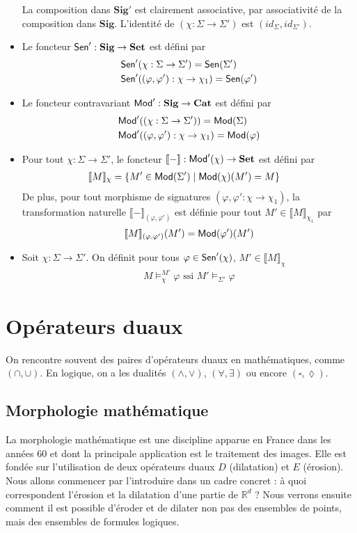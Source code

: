 \documentclass[11pt,a4paper]{article}
\newcommand{\ph}{\varphi}
\newcommand{\itemz}{\item[$\triangleright$]}
\newcommand{\gr}{\textbf}
\newcommand{\lb}{\llbracket}
\newcommand{\rb}{\rrbracket}
\newcommand{\info}[1]{\text{{\fontfamily{lmss}\selectfont #1}}}
\newcommand{\Mod}{\info{Mod}}
\newcommand{\Sen}{\info{Sen}}
\newcommand{\1}{\mathbbm{1}}
\begin{document}
\begin{itemize}
La composition dans $\gr{Sig}'$ est clairement associative, par associativité de la composition dans $\gr{Sig}$. L'identité de $(\chi : \Sigma \to \Sigma')$ est $(id_\Sigma,id_{\Sigma'})$.
\itemz Le foncteur $\Sen' : \gr{Sig} \to \gr{Set}$ est défini par
\begin{align*}
&\Sen'(\chi : \Sigma \to \Sigma') = \Sen(\Sigma') \\
&\Sen'((\ph,\ph') : \chi \to \chi_1) = \Sen(\ph') 
\end{align*}
\itemz Le foncteur contravariant $\Mod' : \gr{Sig} \to \gr{Cat}$ est défini par 
\begin{align*} 
& \Mod'((\chi : \Sigma \to \Sigma')) = \Mod(\Sigma) \\
& \Mod'((\ph,\ph') : \chi \to \chi_1) = \Mod(\ph)
\end{align*}
\itemz Pour tout $\chi : \Sigma \to \Sigma'$, le foncteur $\lb - \rb : \Mod'(\chi) \to \gr{Set}$ est défini par
\begin{align*}
& \lb M \rb_\chi = \{ M' \in \Mod(\Sigma') \mid \Mod(\chi)(M') = M \}
\end{align*}
De plus, pour tout morphisme de signatures $(\ph,\ph' : \chi \to \chi_1)$, la transformation naturelle $\lb - \rb_{(\ph,\ph')}$ est définie pour tout $M' \in \lb M \rb_{\chi_1}$ par
\[ \lb M \rb_{(\ph,\ph')}(M') = \Mod(\ph')(M') \]
\itemz Soit $\chi : \Sigma \to \Sigma'$. On définit pour tous $\ph \in \Sen'(\chi)$, $M' \in \lb M \rb_\chi$
\begin{align*}
M \models_\chi^{M'} \ph \text{ ssi } M' \models_{\Sigma'} \ph
\end{align*}
\end{itemize}
\newpage
\section{Opérateurs duaux}
On rencontre souvent des paires d'opérateurs duaux en mathématiques, comme $(\cap,\cup)$. En logique, on a les dualités $(\wedge,\vee)$, $(\forall,\exists)$ ou encore $(\square,\lozenge)$.
\subsection{Morphologie mathématique}
La morphologie mathématique est une discipline apparue en France dans les années 60 et dont la principale application est le traitement des images. Elle est fondée sur l'utilisation de deux opérateurs duaux $D$ (dilatation) et $E$ (érosion). Nous allons commencer par l'introduire dans un cadre concret : à quoi correspondent l'érosion et la dilatation d'une partie de $\mathbb{R}^d$ ? Nous verrons ensuite comment il est possible d'éroder et de dilater non pas des ensembles de points, mais des ensembles de formules logiques.
\newpage
\end{document}
